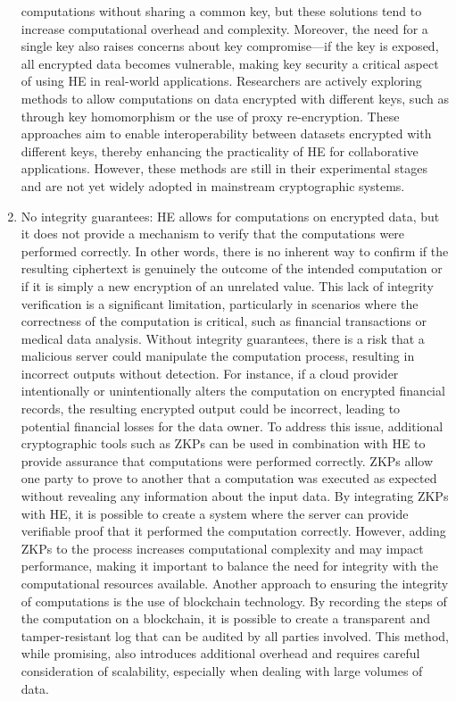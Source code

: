 \documentclass[
  letterpaper,
  DIV=11,
  numbers=noendperiod,
  oneside]{scrartcl}
\begin{document}
\begin{enumerate}
  computations without sharing a common key, but these solutions tend to
  increase computational overhead and complexity. Moreover, the need for
  a single key also raises concerns about key compromise---if the key is
  exposed, all encrypted data becomes vulnerable, making key security a
  critical aspect of using HE in real-world applications. Researchers
  are actively exploring methods to allow computations on data encrypted
  with different keys, such as through key homomorphism or the use of
  proxy re-encryption. These approaches aim to enable interoperability
  between datasets encrypted with different keys, thereby enhancing the
  practicality of HE for collaborative applications. However, these
  methods are still in their experimental stages and are not yet widely
  adopted in mainstream cryptographic systems.
\item
  No integrity guarantees: HE allows for computations on encrypted data,
  but it does not provide a mechanism to verify that the computations
  were performed correctly. In other words, there is no inherent way to
  confirm if the resulting ciphertext is genuinely the outcome of the
  intended computation or if it is simply a new encryption of an
  unrelated value. This lack of integrity verification is a significant
  limitation, particularly in scenarios where the correctness of the
  computation is critical, such as financial transactions or medical
  data analysis. Without integrity guarantees, there is a risk that a
  malicious server could manipulate the computation process, resulting
  in incorrect outputs without detection. For instance, if a cloud
  provider intentionally or unintentionally alters the computation on
  encrypted financial records, the resulting encrypted output could be
  incorrect, leading to potential financial losses for the data owner.
  To address this issue, additional cryptographic tools such as ZKPs can
  be used in combination with HE to provide assurance that computations
  were performed correctly. ZKPs allow one party to prove to another
  that a computation was executed as expected without revealing any
  information about the input data. By integrating ZKPs with HE, it is
  possible to create a system where the server can provide verifiable
  proof that it performed the computation correctly. However, adding
  ZKPs to the process increases computational complexity and may impact
  performance, making it important to balance the need for integrity
  with the computational resources available. Another approach to
  ensuring the integrity of computations is the use of blockchain
  technology. By recording the steps of the computation on a blockchain,
  it is possible to create a transparent and tamper-resistant log that
  can be audited by all parties involved. This method, while promising,
  also introduces additional overhead and requires careful consideration
  of scalability, especially when dealing with large volumes of data.
\end{enumerate}
\end{document}
